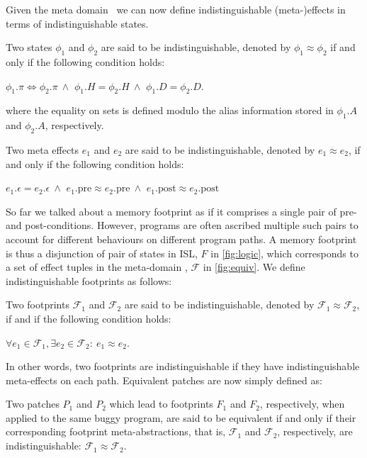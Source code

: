 Given the meta domain \domainequiv ~we can now define  indistinguishable (meta-)effects in terms of indistinguishable states.
\begin{definition}
Two states $\phi_1$ and $\phi_2$ are said to be indistinguishable, denoted by $\phi_1 \approx \phi_2$  if and only if the following condition holds:

\centerline{
$\phi_1.\pi \Leftrightarrow \phi_2.\pi ~\wedge$
$\phi_1.H = \phi_2.H ~\wedge $ 
$\phi_1.D = \phi_2.D.$
}
\noindent where the equality on sets is defined modulo the alias information stored in $\phi_1.A$ and  $\phi_2.A$, respectively. 
\end{definition}

\begin{definition}
Two meta effects $e_1$ and $e_2$ are said to be indistinguishable, denoted by $e_1 \approx e_2$,  if and only if the following condition holds:

\centerline{
 $e_1.\epsilon = e_2.\epsilon ~\wedge$
 $e_1.\text{pre} \approx e_2.\text{pre} ~\wedge$
 $e_1.\text{post} \approx e_2.\text{post} $
}
\end{definition}

So far we talked about a memory footprint as if it comprises a single pair of pre- and post-conditions. However, programs are often ascribed multiple such pairs to account
for different behaviours on different program paths. A memory footprint is thus a disjunction of pair of states in ISL, $F$ in \autoref{fig:logic}, which corresponds to a set of effect tuples in the meta-domain \domainequiv, $\mathcal{F}$ in \autoref{fig:equiv}. We define indistinguishable footprints as follows: 

\begin{definition}
Two footprints $\mathcal{F}_1$ and $\mathcal{F}_2$ are said to be indistinguishable, denoted by $\mathcal{F}_1 \approx \mathcal{F}_2$, if and if the following condition holds:

\centerline{$\forall e_1 \in \mathcal{F}_1, \exists e_2 \in \mathcal{F}_2: ~ e_1 \approx e_2$.}
\end{definition}
In other words, two footprints are indistinguishable if they have indistinguishable meta-effects on each path.  
Equivalent patches are now simply defined as:
\begin{definition}
Two patches $P_1$ and $P_2$ which lead to footprints $F_1$ and $F_2$, respectively, 
when applied to the same buggy program, are said to be equivalent  if and only if their corresponding 
footprint meta-abstractions, that is,  $\mathcal{F}_1$ and $\mathcal{F}_2$, respectively, are indistinguishable:
$\mathcal{F}_1 \approx \mathcal{F}_2$.
\end{definition}

